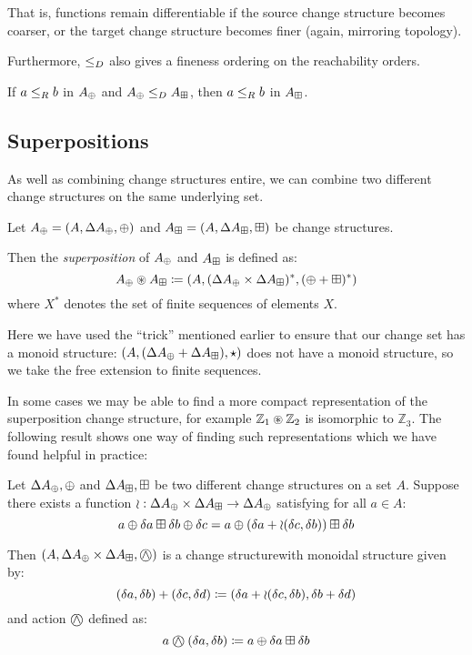 That is, functions remain differentiable if the source change structure becomes
coarser, or the target change structure becomes finer (again, mirroring topology).

Furthermore, $\leq_D$ also gives a fineness ordering on the reachability orders.

\begin{prop}
  If $a \leq_R b$ in $A_\oplus$ and $A_\oplus \leq_D A_\boxplus$, then $a \leq_R b$ in $A_\boxplus$.
\end{prop}

\subsection{Superpositions}

As well as combining change structures entire, we can combine two different
change structures on the same underlying set.

\begin{defn}[Superposition]
  Let $A_\oplus = (A,\Delta A_\oplus,\oplus)$ and $A_\boxplus =
  (A,\Delta A_\boxplus,\boxplus)$ be change structures.

  Then the \textit{superposition} of $A_\oplus$ and $A_\boxplus$ is defined as:
  $$A_\oplus \circledast A_\boxplus \coloneqq (A,
    (\Delta A_\oplus \times \Delta A_\boxplus)^\ast,(\oplus + \boxplus)^\ast)$$
  where $X^\ast$ denotes the set of finite sequences of elements $X$.
\end{defn}

Here we have used the ``trick'' mentioned earlier to ensure that our change
set has a monoid structure: $(A,(\Delta A_\oplus +
  \Delta A_\boxplus),\star)$ does not have a monoid structure, so we take
the free extension to finite sequences.

In some cases we may be able to find a more compact representation of the
superposition change structure, for example $\mathbb{Z}_1 \circledast \mathbb{Z}_2$ is 
isomorphic to $\mathbb{Z}_3$. The following result shows one way of finding such representations which
we have found helpful in practice:

\begin{lemma}
  Let $\Delta A_\oplus, \oplus$ and $\Delta A_\boxplus, \boxplus$ be two different change structures on
  a set $A$. Suppose there exists a function
  $\wr : \Delta A_\oplus \times \Delta A_\boxplus \rightarrow \Delta A_\oplus$ satisfying for
  all $a \in A$:
  $$
    a \oplus \delta a \boxplus \delta b \oplus \delta c
    = a \oplus (\delta a + \wr(\delta c,\delta b)) \boxplus \delta b
  $$

  Then $\cstruct{A}{\changes{A}_\cplus \times \changes{A}_\cpluss}{\cplussym{\wedge}}$
  is a change structurewith monoidal structure given by:
  $$
    (\delta a, \delta b) + (\delta c, \delta d) \coloneqq 
    (\delta a + \wr(\delta c, \delta b), \delta b + \delta d)
  $$
  and action $\cplussym{\wedge}$ defined as:
  $$
    a \cplussym{\wedge} (\change{a}, \change{b}) \defeq a \cplus \change{a} \cpluss \change{b}
  $$
\end{lemma}

